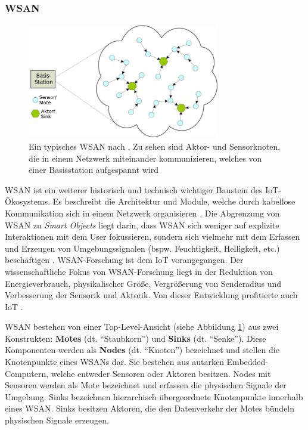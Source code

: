 \subsubsection{\acl{WSAN}}\label{subsubsec:wsan}
\begin{figure}[h]
    \centering
    \includegraphics[width=0.75\textwidth]{bilder/chapter2/wsan.png}
    \caption{Ein typisches \ac{WSAN} nach \cite{feng2008wsan}. Zu sehen sind Aktor- und Sensorknoten, die in einem Netzwerk miteinander kommunizieren, welches von einer Basisstation aufgespannt wird}
    \label{fig:WSAN}
\end{figure}
\ac{WSAN} ist ein weiterer historisch und technisch wichtiger Baustein des \ac{IoT}-Ökosystems. Es beschreibt die Architektur und Module, welche durch kabellose Kommunikation sich in einem Netzwerk organisieren \cite{ferrara2013smart}. Die Abgrenzung von \ac{WSAN} zu \textit{Smart Objects} liegt darin, dass \ac{WSAN} sich weniger auf explizite Interaktionen mit dem User fokussieren, sondern sich vielmehr mit dem Erfassen und Erzeugen von Umgebungssignalen (bspw. Feuchtigkeit, Helligkeit, etc.) beschäftigen \cite{Madakam2015litRev}. \ac{WSAN}-Forschung ist dem \ac{IoT} vorangegangen. Der wissenschaftliche Fokus von \ac{WSAN}-Forschung liegt in der Reduktion von Energieverbrauch, physikalischer Größe, Vergrößerung von Senderadius und Verbesserung der Sensorik und Aktorik. Von dieser Entwicklung profitierte auch \ac{IoT} \cite{lopez2011taxonomy}.

\ac{WSAN} bestehen von einer Top-Level-Ansicht (siehe Abbildung \ref{fig:WSAN}) aus zwei Konstrukten: \textbf{Motes} (dt. "`Staubkorn"') und \textbf{Sinks} (dt. "`Senke"'). Diese Komponenten werden als \textbf{Nodes} (dt. "`Knoten"') bezeichnet und stellen die Knotenpunkte eines \acp{WSAN} dar. Sie bestehen aus autarken Embedded-Computern, welche entweder Sensoren oder Aktoren besitzen. Nodes mit Sensoren werden als Mote bezeichnet \cite{salarian2012coordination} und erfassen die physischen Signale der Umgebung. Sinks bezeichnen hierarchisch übergeordnete Knotenpunkte innerhalb eines \ac{WSAN}. Sinks besitzen Aktoren, die den Datenverkehr der Motes bündeln physischen Signale erzeugen.

